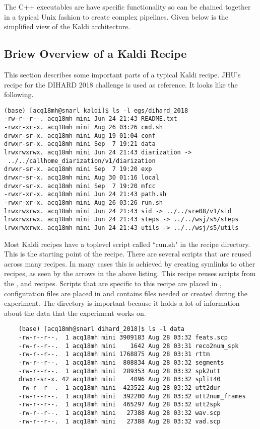 	The C++ executables are have specific functionality so can be chained together in a typical Unix fashion to create complex pipelines. Given below is the simplified view of the Kaldi architecture.
	
	\subsection{Briew Overview of a Kaldi Recipe}
	This section describes some important parts of a typical Kaldi recipe. JHU's recipe for the DIHARD 2018 challenge  is used as reference. It looks like the following.
	
	\begin{verbatim}
(base) [acq18mh@snarl kaldi]$ ls -l egs/dihard_2018
-rw-r--r--. acq18mh mini Jun 24 21:43 README.txt
-rwxr-xr-x. acq18mh mini Aug 26 03:26 cmd.sh
drwxr-sr-x. acq18mh mini Aug 19 01:04 conf
drwxr-sr-x. acq18mh mini Sep  7 19:21 data
lrwxrwxrwx. acq18mh mini Jun 24 21:43 diarization ->
 ../../callhome_diarization/v1/diarization
drwxr-sr-x. acq18mh mini Sep  7 19:20 exp
drwxr-sr-x. acq18mh mini Aug 30 01:16 local
drwxr-sr-x. acq18mh mini Sep  7 19:20 mfcc
-rwxr-xr-x. acq18mh mini Jun 24 21:43 path.sh
-rwxr-xr-x. acq18mh mini Aug 26 03:26 run.sh
lrwxrwxrwx. acq18mh mini Jun 24 21:43 sid -> ../../sre08/v1/sid
lrwxrwxrwx. acq18mh mini Jun 24 21:43 steps -> ../../wsj/s5/steps
lrwxrwxrwx. acq18mh mini Jun 24 21:43 utils -> ../../wsj/s5/utils
	\end{verbatim}
	
	Most Kaldi recipes have a toplevel script called ``run.sh" in the recipe directory. This is the starting point of the recipe. There are several scripts that are reused across many recipes. In many cases this is achieved by creating symlinks to other recipes, as seen by the arrows in the above listing. This recipe reuses scripts from the ,  and  recipes. Scripts that are specific to this recipe are placed in , configuration files are placed in  and  contains files needed or created during the experiment. The  directory is important because it holds a lot of information about the data that the experiment works on.
	
	\begin{verbatim}
	(base) [acq18mh@snarl dihard_2018]$ ls -l data
	-rw-r--r--.  1 acq18mh mini 3909183 Aug 28 03:32 feats.scp
	-rw-r--r--.  1 acq18mh mini    1642 Aug 28 03:31 reco2num_spk
	-rw-r--r--.  1 acq18mh mini 1768875 Aug 28 03:31 rttm
	-rw-r--r--.  1 acq18mh mini  808834 Aug 28 03:32 segments
	-rw-r--r--.  1 acq18mh mini  289353 Aug 28 03:32 spk2utt
	drwxr-sr-x. 42 acq18mh mini    4096 Aug 28 03:32 split40
	-rw-r--r--.  1 acq18mh mini  423522 Aug 28 03:32 utt2dur
	-rw-r--r--.  1 acq18mh mini  392200 Aug 28 03:32 utt2num_frames
	-rw-r--r--.  1 acq18mh mini  465297 Aug 28 03:32 utt2spk
	-rw-r--r--.  1 acq18mh mini   27388 Aug 28 03:32 wav.scp
	-rw-r--r--.  1 acq18mh mini   27388 Aug 28 03:32 vad.scp
	\end{verbatim}
	
